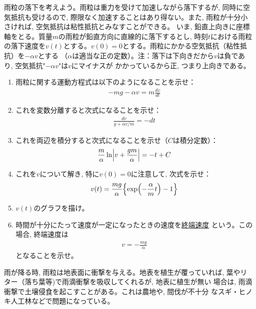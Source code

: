 %
\begin{q}\label{q:raindrop}
雨粒の落下を考えよう。雨粒は重力を受けて加速しながら落下するが, 同時に空気抵抗も受けるので, 
際限なく加速することはあり得ない。また, 雨粒が十分小さければ, 空気抵抗は粘性抵抗とみなすことができる。
いま, 鉛直上向きに座標軸をとる。質量$m$の雨粒が鉛直方向に直線的に落下するとし, 時刻$t$における雨粒
の落下速度を$v(t)$とする。$v(0)=0$とする。雨粒にかかる空気抵抗（粘性抵抗）を$-\alpha v$とする
（$\alpha$は適当な正の定数）。注：落下は下向きだから$v$は負であり, 空気抵抗"$-\alpha v$"は$v$にマイナスが
かかっているから正, つまり上向きである。
\begin{enumerate}
\item 雨粒に関する運動方程式は以下のようになることを示せ：
\begin{eqnarray}
-mg-\alpha v=m\frac{dv}{dt}\label{eq:raindrop1}
\end{eqnarray}
\item これを変数分離すると次式になることを示せ：
\begin{eqnarray}
\frac{dv}{g+\alpha v/m}=-dt\label{eq:raindrop2}
\end{eqnarray}
\item これを両辺を積分すると次式になることを示せ（$C$は積分定数）：
\begin{eqnarray}
\frac{m}{\alpha}\ln\Bigl|v+\frac{gm}{\alpha}\Bigr|=-t+C\label{eq:raindrop3}
\end{eqnarray}
\item これを$v$について解き, 特に$v(0)=0$に注意して, 次式を示せ：
\begin{eqnarray}
v(t)=\frac{mg}{\alpha}\Bigl\{\exp\Bigl(-\frac{\alpha}{m}t\Bigr)-1\Bigr\}\label{eq:raindrop4}
\end{eqnarray}
\item $v(t)$のグラフを描け。
\item 時間が十分にたって速度が一定になったときの速度を\underline{終端速度}
という。この場合, 終端速度は
\begin{eqnarray}v=-\frac{mg}{\alpha}\end{eqnarray}
となることを示せ。
\end {enumerate}
\end{q}
\mv

雨が降る時, 雨粒は地表面に衝撃を与える。地表を植生が覆っていれば, 
葉やリター（落ち葉等)で雨滴衝撃を吸収してくれるが, 地表に植生が無い
場合は, 雨滴衝撃で土壌侵食を起こすことがある。これは農地や, 間伐が不十分
なスギ・ヒノキ人工林などで問題になっている。\mv

